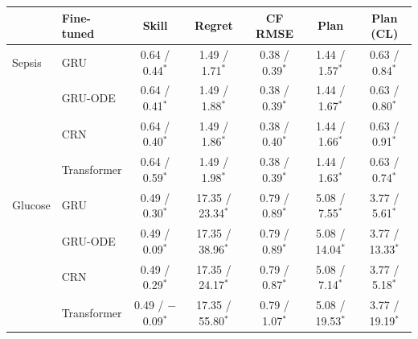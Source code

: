 \begin{tabular}{llccccc}
\toprule
 & Fine-tuned & Skill & Regret & CF RMSE & Plan & Plan (CL) \\
\midrule
Sepsis & GRU & 0.64 / 0.44$^{*}$ & 1.49 / 1.71$^{*}$ & 0.38 / 0.39$^{*}$ & 1.44 / 1.57$^{*}$ & 0.63 / 0.84$^{*}$ \\
 & GRU-ODE & 0.64 / 0.41$^{*}$ & 1.49 / 1.88$^{*}$ & 0.38 / 0.39$^{*}$ & 1.44 / 1.67$^{*}$ & 0.63 / 0.80$^{*}$ \\
 & CRN & 0.64 / 0.40$^{*}$ & 1.49 / 1.86$^{*}$ & 0.38 / 0.40$^{*}$ & 1.44 / 1.66$^{*}$ & 0.63 / 0.91$^{*}$ \\
 & Transformer & 0.64 / 0.59$^{*}$ & 1.49 / 1.98$^{*}$ & 0.38 / 0.39$^{*}$ & 1.44 / 1.63$^{*}$ & 0.63 / 0.74$^{*}$ \\
\midrule
Glucose & GRU & 0.49 / 0.30$^{*}$ & 17.35 / 23.34$^{*}$ & 0.79 / 0.89$^{*}$ & 5.08 / 7.55$^{*}$ & 3.77 / 5.61$^{*}$ \\
 & GRU-ODE & 0.49 / 0.09$^{*}$ & 17.35 / 38.96$^{*}$ & 0.79 / 0.89$^{*}$ & 5.08 / 14.04$^{*}$ & 3.77 / 13.33$^{*}$ \\
 & CRN & 0.49 / 0.29$^{*}$ & 17.35 / 24.17$^{*}$ & 0.79 / 0.87$^{*}$ & 5.08 / 7.14$^{*}$ & 3.77 / 5.18$^{*}$ \\
 & Transformer & 0.49 / $-$0.09$^{*}$ & 17.35 / 55.80$^{*}$ & 0.79 / 1.07$^{*}$ & 5.08 / 19.53$^{*}$ & 3.77 / 19.19$^{*}$ \\
\bottomrule
\end{tabular}
